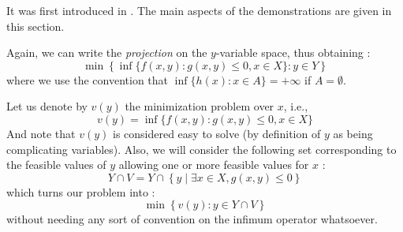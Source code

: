 It was first introduced in \cite{Geoffrion1972}. The main aspects of the demonstrations are given in this section. 

Again, we can write the \textit{projection} on the $y$-variable space, thus obtaining : 
\[
    \min\left\{ \inf\{ f(x,y) : g(x,y)\le 0, x\in X \} : y \in Y \right\}
\] where we use the convention that $\inf\{ h(x) : x\in A \} = +\infty$ if $A=\emptyset$. 

Let us denote by $v(y)$ the minimization problem over $x$, i.e., 
\[
    v(y) = \inf\{ f(x,y) : g(x,y)\le 0, x\in X \}
\] And note that $v(y)$ is considered easy to solve (by definition of $y$ as being complicating variables). Also, we will consider the following set corresponding to the feasible values of $y$ allowing one or more feasible values for $x$ : 
\[
    Y\cap V = Y\cap\left\{ y \middle| \exists x\in X, g(x, y)\le 0 \right\}
\] which turns our problem into : \[ \min\left\{ v(y) : y \in Y\cap V \right\} \] without needing any sort of convention on the infimum operator whatsoever. 

